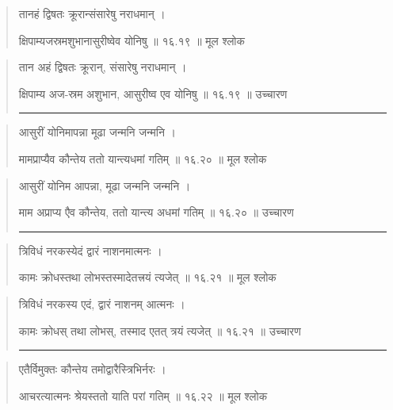 \begin{quotation}

तानहं द्विषतः क्रूरान्संसारेषु नराधमान्‌ ।  

क्षिपाम्यजस्रमशुभानासुरीष्वेव योनिषु  ॥ १६.१९ ॥  मूल श्लोक
\end{quotation}

\begin{quotation}

तान अहं द्विषतः क्रूरान्, संसारेषु नराधमान्‌ ।  

क्षिपाम्य अज-स्रम अशुभान, आसुरीष्व एव योनिषु  ॥ १६.१९ ॥  उच्चारण

\noindent\rule{16cm}{0.4pt} 
\end{quotation}


\begin{quotation}

आसुरीं योनिमापन्ना मूढा जन्मनि जन्मनि ।  

मामप्राप्यैव कौन्तेय ततो यान्त्यधमां गतिम्‌  ॥ १६.२० ॥  मूल श्लोक
\end{quotation}

\begin{quotation}

आसुरीं योनिम आपन्ना, मूढा जन्मनि जन्मनि ।  

माम अप्राप्य एैव कौन्तेय, ततो यान्त्य अधमां गतिम्‌  ॥ १६.२० ॥  उच्चारण

\noindent\rule{16cm}{0.4pt} 
\end{quotation}


\begin{quotation}

त्रिविधं नरकस्येदं द्वारं नाशनमात्मनः ।  

कामः क्रोधस्तथा लोभस्तस्मादेतत्त्रयं त्यजेत्‌  ॥ १६.२१ ॥  मूल श्लोक
\end{quotation}

\begin{quotation}

त्रिविधं नरकस्य एदं, द्वारं नाशनम् आत्मनः ।  

कामः क्रोधस् तथा लोभस्, तस्माद एतत् त्रयं त्यजेत्‌  ॥ १६.२१ ॥  उच्चारण

\noindent\rule{16cm}{0.4pt} 
\end{quotation}


\begin{quotation}

एतैर्विमुक्तः कौन्तेय तमोद्वारैस्त्रिभिर्नरः ।  

आचरत्यात्मनः श्रेयस्ततो याति परां गतिम्‌  ॥ १६.२२ ॥  मूल श्लोक
\end{quotation}

